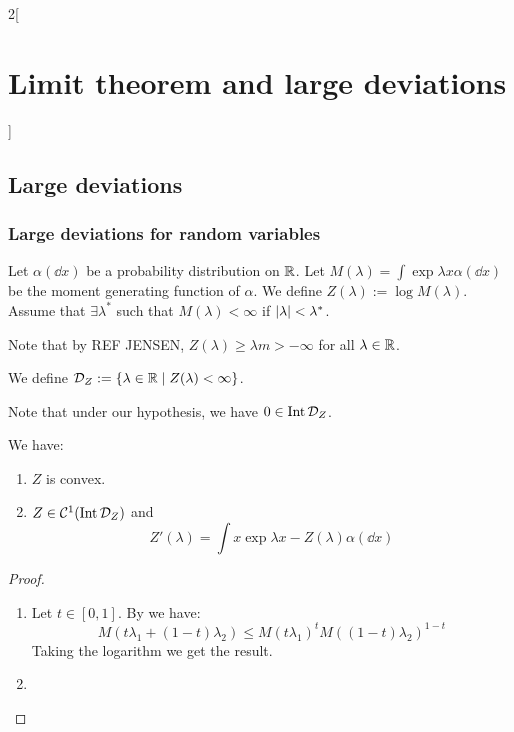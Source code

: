 \documentclass[../../../main_math.tex]{subfiles}
\begin{document}
\begin{multicols}{2}[\section{Limit theorem and large deviations}]
  \subsection{Large deviations}
  \subsubsection{Large deviations for \iid random variables}
  \begin{definition}
    Let $\alpha(\dd{x})$ be a probability distribution on $\mathbb{R}$. Let $M(\lambda)=\int\exp{\lambda x}\alpha(\dd{x})$ be the moment generating function of $\alpha$. We define $Z(\lambda):= \log M(\lambda)$. Assume that $\exists \lambda^*$ such that $M(\lambda)<\infty$ if $\abs{\lambda}<\lambda^*$.
  \end{definition}
  \begin{remark}
    Note that by REF JENSEN, $Z(\lambda)\geq \lambda m>-\infty$ for all $\lambda\in\mathbb{R}$.
  \end{remark}
  \begin{definition}
    We define $\mathcal{D}_Z:=\{\lambda\in\mathbb{R}\mid Z(\lambda)<\infty\}$.
  \end{definition}
  \begin{remark}
    Note that under our hypothesis, we have $0\in \operatorname{Int} \mathcal{D}_Z$.
  \end{remark}
  \begin{lemma}
    We have:
    \begin{enumerate}
      \item $Z$ is convex.
      \item $Z\in\mathcal{C}^1(\operatorname{Int}\mathcal{D}_Z)$ and
            $$
              Z'(\lambda)=\int x\exp{\lambda x-Z(\lambda)}\alpha(\dd{x})
            $$
    \end{enumerate}
  \end{lemma}
  \begin{proof}
    \begin{enumerate}
      \item Let $t\in[0,1]$. By  we have:
            $$
              M(t\lambda_1+(1-t)\lambda_2)\leq M(t\lambda_1)^tM((1-t)\lambda_2)^{1-t}
            $$
            Taking the logarithm we get the result.
      \item

\end{enumerate}
\end{proof}
\end{multicols}
\end{document}
